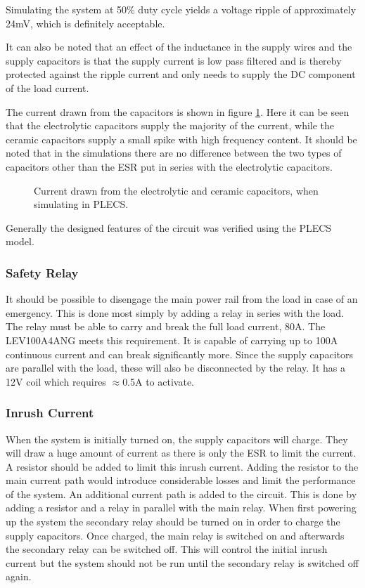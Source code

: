 Simulating the system at 50\% duty cycle yields a voltage ripple of approximately 24mV, which is definitely acceptable. 

It can also be noted that an effect of the inductance in the supply wires and the supply capacitors is that the supply current is low pass filtered and is thereby protected against the ripple current and only needs to supply the DC component of the load current.

The current drawn from the capacitors is shown in figure \ref{fig:cap_currents}.
Here it can be seen that the electrolytic capacitors supply the majority of the current, while the ceramic capacitors supply a small spike with high frequency content.
It should be noted that in the simulations there are no difference between the two types of capacitors other than the ESR put in series with the electrolytic capacitors. 

\begin{figure}[h]
	\centering
    
	\caption{Current drawn from the electrolytic and ceramic capacitors, when simulating in PLECS. }
	\label{fig:cap_currents}
\end{figure}

Generally the designed features of the circuit was verified using the PLECS model.

\subsubsection{Safety Relay} %
\label{ssub:safety_relay}
It should be possible to disengage the main power rail from the load in case of an emergency.
This is done most simply by adding a relay in series with the load.
The relay must be able to carry and break the full load current, 80A.
The LEV100A4ANG meets this requirement. 
It is capable of carrying up to 100A continuous current and can break significantly more.
Since the supply capacitors are parallel with the load, these will also be disconnected by the relay.
It has a 12V coil which requires $\approx$0.5A to activate.

\subsubsection{Inrush Current}
\label{ssub:inrush_current}
When the system is initially turned on, the supply capacitors will charge.
They will draw a huge amount of current as there is only the ESR to limit the current. 
A resistor should be added to limit this inrush current. 
Adding the resistor to the main current path would introduce considerable losses and limit the performance of the system.
An additional current path is added to the circuit.
This is done by adding a resistor and a relay in parallel with the main relay.
When first powering up the system the secondary relay should be turned on in order to charge the supply capacitors.
Once charged, the main relay is switched on and afterwards the secondary relay can be switched off.
This will control the initial inrush current but the system should not be run until the secondary relay is switched off again.


